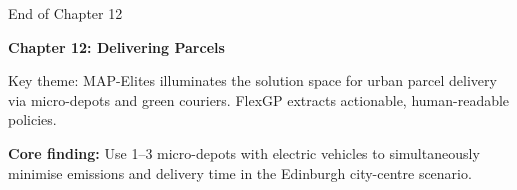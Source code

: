 \documentclass[aspectratio=169,10pt]{beamer}
\begin{document}
\begin{frame}{End of Chapter 12}
  \begin{center}
    \Large\textbf{Chapter 12: Delivering Parcels}

    \bigskip
    \normalsize
    Key theme: MAP-Elites illuminates the solution space for
    urban parcel delivery via micro-depots and green couriers.
    FlexGP extracts actionable, human-readable policies.

    \bigskip
    \textbf{Core finding:} Use 1--3 micro-depots with electric vehicles
    to simultaneously minimise emissions and delivery time
    in the Edinburgh city-centre scenario.
  \end{center}
\end{frame}
\end{document}

